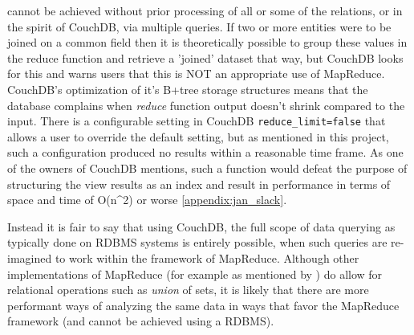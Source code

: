 cannot be achieved without prior processing of all or some of the relations, or in the spirit of CouchDB, via multiple queries. If two or more entities were to be joined on a common field then it is theoretically possible to group these values in the reduce function and retrieve a 'joined' dataset that way, but CouchDB looks for this and warns users that this is NOT an appropriate use of MapReduce. CouchDB's optimization of it's B+tree storage structures means that the database complains when \textit{reduce} function output doesn't shrink compared to the input. There is a configurable setting in CouchDB \texttt{reduce_limit=false} that allows a user to override the default setting, but as mentioned in this project, such a configuration produced no results within a reasonable time frame. As one of the owners of CouchDB mentions, such a function would defeat the purpose of structuring the view results as an index and result in performance in terms of space and time of O(n^2) or worse \ref{appendix:jan_slack}.

Instead it is fair to say that using CouchDB, the full scope of data querying as typically done on RDBMS systems is entirely possible, when such queries are re-imagined to work within the framework of MapReduce. Although other implementations of MapReduce (for example as mentioned by \cite{chandar2010}) do allow for relational operations such as \textit{union} of sets, it is likely that there are more performant ways of analyzing the same data in ways that favor the MapReduce framework (and cannot be achieved using a RDBMS).